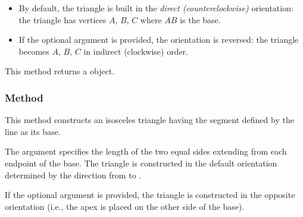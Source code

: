 \begin{itemize}
  \item By default, the triangle is built in the \emph{direct (counterclockwise)} orientation: the triangle has vertices $A$, $B$, $C$ where $AB$ is the base.
  \item If the optional argument  is provided, the orientation is reversed: the triangle becomes $A$, $B$, $C$ in indirect (clockwise) order.
\end{itemize}

\medskip
\noindent
This method returns a  object.


\vspace{1em}
\begin{minipage}{.5\textwidth}
  \begin{center}
  \end{center}
\end{minipage}
\begin{minipage}{.5\textwidth}
\begin{tkzexample}
\end{tkzexample}
\end{minipage}

\subsubsection{Method }
\label{ssub:method_line_isosceles}

This method constructs an isosceles triangle having the segment defined by the line as its base.

\medskip
\noindent
The argument  specifies the length of the two equal sides extending from each endpoint of the base. The triangle is constructed in the default orientation determined by the direction from  to .

\medskip
\noindent
If the optional argument  is provided, the triangle is constructed in the opposite orientation (i.e., the apex is placed on the other side of the base).

